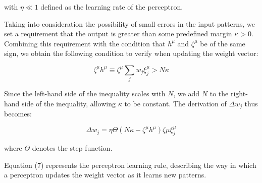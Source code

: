 \noindent with $\eta \ll 1$ defined as the learning rate of the perceptron.

Taking into consideration the possibility of small errors in the input patterns, we set a requirement that the output is greater than some predefined margin $\kappa > 0$. Combining this requirement with the condition that $h^\mu$ and $\zeta^\mu$ be of the same sign, we obtain the following condition to verify when updating the weight vector:

\begin{equation}
    \zeta^\mu h^\mu \equiv \zeta^\mu \sum_j w_{j} \xi_j^\mu > N \kappa
\end{equation}

Since the left-hand side of the inequality scales with $N$, we add $N$ to the right-hand side of the inequality, allowing $\kappa$ to be constant. The derivation of $\Delta w_{j}$ thus becomes:

\begin{equation}
    \Delta w_{j} = \eta \Theta(N \kappa - \zeta^\mu h^\mu) \zeta\mu \xi_j^{\mu}
\end{equation}

\noindent where $\Theta$ denotes the step function.

Equation (7) represents the perceptron learning rule, describing the way in which a perceptron updates the weight vector as it learns new patterns.